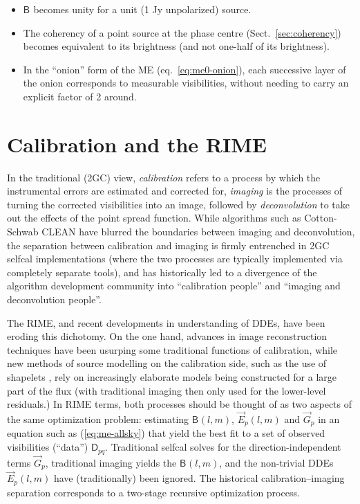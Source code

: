 \documentclass[]{aa}
\newcommand{\jones}[2]{\vec {#1}_{#2}}
\newcommand{\coh}[2]{\mathsf{{#1}}_{{#2}}}
\begin{document}
\begin{itemize}
\item $\coh{B}{}$ becomes unity for a unit (1 Jy unpolarized) source.
\item The coherency of a point source at the phase centre (Sect.~\ref{sec:coherency}) becomes equivalent to its brightness (and not one-half of its brightness).
\item In the ``onion'' form of the ME (eq.~\ref{eq:me0-onion}), each successive layer of the onion corresponds to measurable visibilities, without needing to carry an explicit factor of 2 around.
\end{itemize}

\section{\label{sec:calibration}Calibration and the RIME}

In the traditional (2GC) view, \emph{calibration} refers to a process by which the instrumental errors are estimated and corrected for, \emph{imaging} is the processes of turning the corrected visibilities into an image, followed by \emph{deconvolution} to take out the effects of the point spread function. While algorithms such as Cotton-Schwab CLEAN \citep{Schwab:csclean} have blurred the boundaries between imaging and deconvolution, the separation between calibration and imaging is firmly entrenched in 2GC selfcal implementations (where the two processes are typically implemented via completely separate tools), and has historically led to a divergence of the algorithm development community into ``calibration people'' and ``imaging and deconvolution people''. 

The RIME, and recent developments in understanding of DDEs, have been eroding this dichotomy. On the one hand, advances in image reconstruction techniques \citep[for an overview, see][]{Rau:DDEs} have been usurping some traditional functions of calibration, while new methods of source modelling on the calibration side, such as the use of shapelets \citep{Yatawatta:shapelets}, rely on increasingly elaborate models being constructed for a large part of the flux (with traditional imaging then only used for the lower-level residuals.) In RIME terms, both processes should be thought of as two aspects of the same optimization problem: estimating $\coh{B}{}(l,m)$, $\jones{E}{p}(l,m)$ and $\jones{G}{p}$ in an equation such as (\ref{eq:me-allsky}) that yield the best fit to a set of observed visibilities  (``data'') $\coh{D}{pq}$. Traditional selfcal solves for the direction-independent terms $\jones{G}{p}$, traditional imaging yields the $\coh{B}{}(l,m)$, and the non-trivial DDEs $\jones{E}{p}(l,m)$ have (traditionally) been ignored. The historical calibration--imaging separation corresponds to a two-stage recursive optimization process. 
\end{document}

